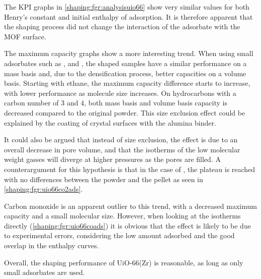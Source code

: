 The KPI graphs in \autoref{shaping:fgr:analysisuio66} show very
similar values for both Henry's constant and initial
enthalpy of adsorption. It is therefore apparent that the shaping process
did not change the interaction of the adsorbate with the MOF surface.

The maximum capacity graphs show a more interesting trend.
When using small adsorbates such as ,  and ,
the shaped samples have a similar performance on a mass basis and,
due to the densification process, better capacities on a volume
basis. Starting with ethane, the maximum capacity difference starts
to increase, with lower performance as molecule size increases.
On hydrocarbons with a carbon number of 3 and 4, both mass basis and
volume basis capacity is decreased compared to the original powder.
This size exclusion effect could be explained by the coating of
crystal surfaces with the alumina binder.

It could also be argued that instead of size exclusion, the effect is due to
an overall decrease in pore volume, and that the isotherms of the
low molecular weight gasses will diverge at higher pressures
as the pores are filled. A counterargument for this hypothesis is that
in the case of , the plateau is reached with no differences
between the powder and the pellet as seen
in \autoref{shaping:fgr:uio66co2ads}.

Carbon monoxide is an apparent outlier to this trend, with a
decreased maximum capacity and a small molecular size.
However, when looking at the isotherms directly
(\autoref{shaping:fgr:uio66coads}) it is obvious that the effect is
likely to be due to experimental errors, considering
the low amount adsorbed and the good overlap in the enthalpy
curves.

Overall, the shaping performance of UiO-66(Zr) is
reasonable, as long as only small adsorbates are used.
